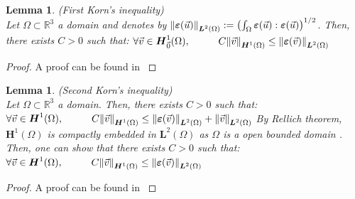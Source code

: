\documentclass[a4paper,12pt,twoside]{report}
\newcommand{\mtr}{\mathbb{R}}
\newtheorem{lemma}[theorem]{Lemma}
\begin{document}
\begin{lemma}
\label{Korn1}
    (First Korn's inequality) \\
    Let $\Omega \subset \mtr^3$ a domain and denotes by $\norm{\boldsymbol \varepsilon(\vec u)}_{\boldsymbol L^2(\Omega)} := \left(\int_\Omega \boldsymbol \varepsilon(\vec u):\boldsymbol \varepsilon(\vec u)\right)^{1/2}$. Then, there exists $C > 0$ such that: $\forall \vec v \in \boldsymbol H^1_{\vec 0}(\Omega), \hspace{1cm} C\norm{\vec v}_{\boldsymbol H^1(\Omega)} \leq \norm{\boldsymbol \varepsilon(\vec v)}_{\boldsymbol L^2(\Omega)}$
\end{lemma}
\begin{proof}
    A proof can be found in \cite{brenner_mathematical_2008}
\end{proof}

\begin{lemma}
\label{Korn2}
    (Second Korn's inequality) \\
    Let $\Omega \subset \mtr^3$ a domain. Then, there exists $C > 0$ such that: 
    $\forall \vec v \in \boldsymbol H^1(\Omega), \hspace{1cm} C\norm{\vec v}_{\boldsymbol H^1(\Omega)} \leq \norm{\boldsymbol \varepsilon(\vec v)}_{\boldsymbol L^2(\Omega)} + \norm{\vec v}_{\boldsymbol L^2(\Omega)}$
    By Rellich theorem, $\boldsymbol H^1(\Omega)$ is compactly embedded in $\boldsymbol L^2(\Omega)$ as $\Omega$ is a open bounded domain . Then, one can show that there exists $C > 0$ such that:
    $\forall \vec v \in \boldsymbol H^1(\Omega), \hspace{1cm} C\norm{\vec v}_{\boldsymbol H^1(\Omega)} \leq \norm{\boldsymbol \varepsilon(\vec v)}_{\boldsymbol L^2(\Omega)}$
\end{lemma}
\begin{proof}
    A proof can be found in \cite{brenner_mathematical_2008}
\end{proof}
\end{document}
